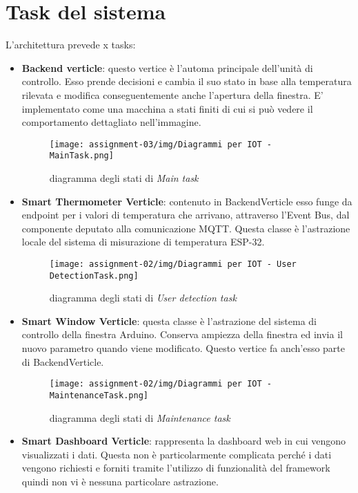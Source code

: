 \documentclass{report}
\begin{document}
\section{Task del sistema}

\par{
L'architettura prevede x tasks: 
}
\begin{itemize}
    \item {
    \textbf{Backend verticle}: questo vertice è l'automa principale dell'unità di controllo. Esso prende decisioni e cambia il suo stato in base alla temperatura rilevata e modifica conseguentemente anche l'apertura della finestra. E' implementato come una macchina a stati finiti di cui si può vedere il comportamento dettagliato nell'immagine.
    \begin{figure}[H]
        \centering
        \texttt{[image: assignment-03/img/Diagrammi per IOT - MainTask.png]}
        \caption{diagramma degli stati di \textit{Main task}}
        \label{fig:main-task}
    \end{figure}
    }
    \item {
    \textbf{Smart Thermometer Verticle}: contenuto in BackendVerticle esso funge da endpoint per i valori di temperatura che arrivano, attraverso l'Event Bus, dal componente deputato alla comunicazione MQTT. Questa classe è l'astrazione locale del sistema di misurazione di temperatura ESP-32.
    \begin{figure}[H]
        \centering
        \texttt{[image: assignment-02/img/Diagrammi per IOT - User DetectionTask.png]}
        \caption{diagramma degli stati di \textit{User detection task}}
        \label{fig:detection-task}
    \end{figure}
    }
    \item {
    \textbf{Smart Window Verticle}: questa classe è l'astrazione del sistema di controllo della finestra Arduino. Conserva ampiezza della finestra ed invia il nuovo parametro quando viene modificato. Questo vertice fa anch'esso parte di BackendVerticle.
    \begin{figure}[H]
        \centering
        \texttt{[image: assignment-02/img/Diagrammi per IOT - MaintenanceTask.png]}
        \caption{diagramma degli stati di \textit{Maintenance task}}
        \label{fig:maintenance-task}
    \end{figure}
    }
    \item {
    \textbf{Smart Dashboard Verticle}: rappresenta la dashboard web in cui vengono visualizzati i dati. Questa non è particolarmente complicata perché i dati vengono richiesti e forniti tramite l'utilizzo di funzionalità del framework quindi non vi è nessuna particolare astrazione. 
    }
\end{itemize}
\end{document}
